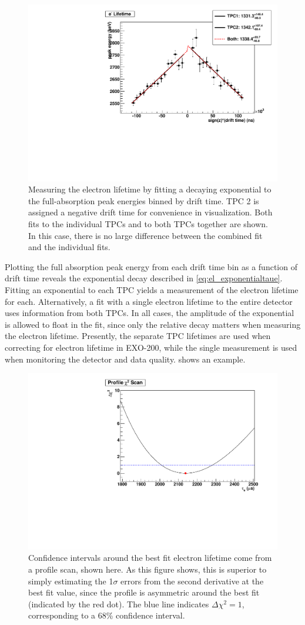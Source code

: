 \documentclass[herrin-thesis.tex]{subfiles}
\begin{document}
\begin{figure}[htbp]
\centering
\includegraphics[width=0.6\columnwidth]{./plots/el_run4228_fit.pdf}
\caption[An example fit to exponential attenuation]{Measuring the electron lifetime by fitting a decaying exponential to the full-absorption peak energies binned by drift time. TPC 2 is assigned a negative drift time for convenience in visualization. Both fits to the individual TPCs and to both TPCs together are shown. In this case, there is no large difference between the combined fit and the individual fits.}
\label{fig:el_elfit}
\end{figure}

Plotting the full absorption peak energy from each drift time bin as a function of drift time reveals the exponential decay described in \cref{eq:el_exponentialtaue}. Fitting an exponential to each TPC yields a measurement of the electron lifetime for each. Alternatively, a fit with a single electron lifetime to the entire detector uses information from both TPCs. In all cases, the amplitude of the exponential is allowed to float in the fit, since only the relative decay matters when measuring the electron lifetime. Presently, the separate TPC lifetimes are used when correcting for electron lifetime in EXO-200, while the single measurement is used when monitoring the detector and data quality.  shows an example.

\begin{figure}[htb]
\centering
\includegraphics[width=0.6\columnwidth]{./plots/el_run4252_profile.pdf}
\caption[A profile scan around the best-fit electron lifetime]{Confidence intervals around the best fit electron lifetime come from a profile scan, shown here. As this figure shows, this is superior to simply estimating the 1\(\sigma\) errors from the second derivative at the best fit value, since the profile is asymmetric around the best fit (indicated by the red dot). The blue line indicates \(\Delta\chi^2 = 1\), corresponding to a 68\% confidence interval.}
\label{fig:el_profileel}
\end{figure}
\end{document}
